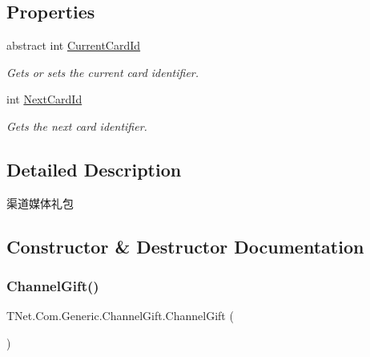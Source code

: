 \subsection*{Properties}
\begin{DoxyCompactItemize}
\item 
abstract int \mbox{\hyperlink{class_t_net_1_1_com_1_1_generic_1_1_channel_gift_a41604aea51abd196526f40a80988e214}{Current\+Card\+Id}}
\begin{DoxyCompactList}\small\item\em Gets or sets the current card identifier. \end{DoxyCompactList}\item 
int \mbox{\hyperlink{class_t_net_1_1_com_1_1_generic_1_1_channel_gift_a0f190a3a2f0577760011efd1be43d085}{Next\+Card\+Id}}
\begin{DoxyCompactList}\small\item\em Gets the next card identifier. \end{DoxyCompactList}\end{DoxyCompactItemize}


\subsection{Detailed Description}
渠道媒体礼包 



\subsection{Constructor \& Destructor Documentation}
\mbox{\label{class_t_net_1_1_com_1_1_generic_1_1_channel_gift_ad4511c1cff4205db5b89d6796271db14}} 
\subsubsection{\texorpdfstring{Channel\+Gift()}{ChannelGift()}}
{\footnotesize\ttfamily T\+Net.\+Com.\+Generic.\+Channel\+Gift.\+Channel\+Gift (\begin{DoxyParamCaption}{ }\end{DoxyParamCaption})\hspace{0.3cm}{\ttfamily [protected]}}



